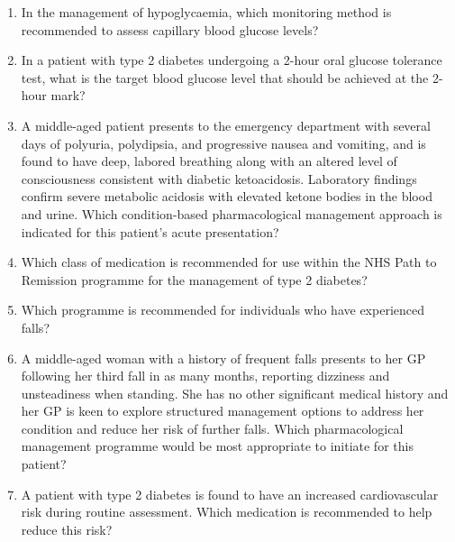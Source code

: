 \begin{enumerate}
\item In the management of hypoglycaemia, which monitoring method is recommended to assess capillary blood glucose levels?

\item In a patient with type 2 diabetes undergoing a 2-hour oral glucose tolerance test, what is the target blood glucose level that should be achieved at the 2-hour mark?

\item A middle-aged patient presents to the emergency department with several days of polyuria, polydipsia, and progressive nausea and vomiting, and is found to have deep, labored breathing along with an altered level of consciousness consistent with diabetic ketoacidosis. Laboratory findings confirm severe metabolic acidosis with elevated ketone bodies in the blood and urine. Which condition-based pharmacological management approach is indicated for this patient's acute presentation?

\item Which class of medication is recommended for use within the NHS Path to Remission programme for the management of type 2 diabetes?

\item Which programme is recommended for individuals who have experienced falls?

\item A middle-aged woman with a history of frequent falls presents to her GP following her third fall in as many months, reporting dizziness and unsteadiness when standing. She has no other significant medical history and her GP is keen to explore structured management options to address her condition and reduce her risk of further falls. Which pharmacological management programme would be most appropriate to initiate for this patient?

\item A patient with type 2 diabetes is found to have an increased cardiovascular risk during routine assessment. Which medication is recommended to help reduce this risk?

\end{enumerate}
